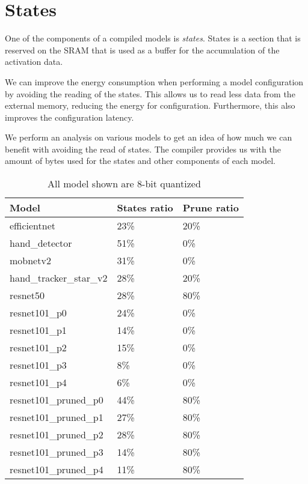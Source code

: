 \section{States}
One of the components of a compiled models is \textit{states}.
States is a section that is reserved on the SRAM that is used as a buffer for the accumulation of the activation data.


We can improve the energy consumption when performing a model configuration by avoiding the reading of the states.
This allows us to read less data from the external memory, reducing the energy for configuration.
Furthermore, this also improves the configuration latency.

We perform an analysis on various models to get an idea of how much we can benefit with avoiding the read of states.
The compiler provides us with the amount of bytes used for the states and other components of each model.

\begin{table}[hbtp]
\centering
\begin{tabular}{@{}lll@{}}
\toprule
\textbf{Model}          & \textbf{States ratio} & \textbf{Prune ratio} \\ \midrule
efficientnet            & 23\%                  & 20\%                 \\
hand\_detector          & 51\%                  & 0\%                  \\
mobnetv2                & 31\%                  & 0\%                  \\
hand\_tracker\_star\_v2 & 28\%                  & 20\%                 \\
resnet50                & 28\%                  & 80\%                 \\
resnet101\_p0           & 24\%                  & 0\%                  \\
resnet101\_p1           & 14\%                  & 0\%                  \\
resnet101\_p2           & 15\%                  & 0\%                  \\
resnet101\_p3           & 8\%                   & 0\%                  \\
resnet101\_p4           & 6\%                   & 0\%                  \\
resnet101\_pruned\_p0   & 44\%                  & 80\%                 \\
resnet101\_pruned\_p1   & 27\%                  & 80\%                 \\
resnet101\_pruned\_p2   & 28\%                  & 80\%                 \\
resnet101\_pruned\_p3   & 14\%                  & 80\%                 \\
resnet101\_pruned\_p4   & 11\%                  & 80\%                 \\ \bottomrule
\end{tabular}
\caption{All model shown are 8-bit quantized}
\label{tab:states_ratio}
\end{table}

